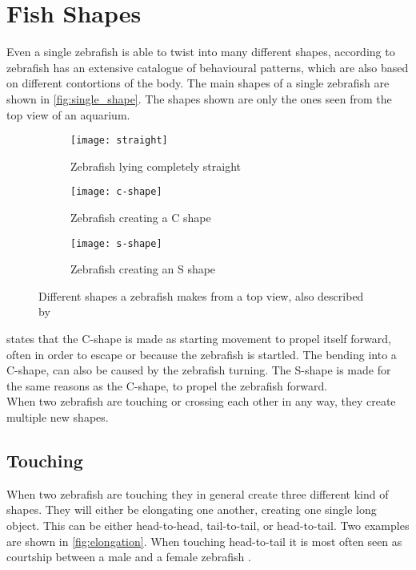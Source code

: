 \section{Fish Shapes}
Even a single zebrafish is able to twist into many different shapes, according to \cite{Kalueff2013} zebrafish has an extensive catalogue of behavioural patterns, which are also based on different contortions of the body. The main shapes of a single zebrafish are shown in \autoref{fig:single_shape}. The shapes shown are only the ones seen from the top view of an aquarium.

\begin{figure}[H]
	\centering
	\begin{subfigure}[b]{0.3\textwidth}
		\texttt{[image: straight]}
		\caption{Zebrafish lying completely straight}
		\label{fig:straight_fish}
	\end{subfigure}
	\begin{subfigure}[b]{0.3\textwidth}
		\texttt{[image: c-shape]}
		\caption{Zebrafish creating a C shape}
		\label{fig:c-shape_fish}
	\end{subfigure}
	\begin{subfigure}[b]{0.3\textwidth}
		\texttt{[image: s-shape]}
		\caption{Zebrafish creating an S shape}
		\label{fig:s-shape_fish}
	\end{subfigure}
\caption{Different shapes a zebrafish makes from a top view, also described by \cite{Kalueff2013}}
\label{fig:single_shape}
\end{figure}

\cite{Kalueff2013} states that the C-shape is made as starting movement to propel itself forward, often in order to escape or because the zebrafish is startled. The bending into a C-shape, can also be caused by the zebrafish turning. The S-shape is made for the same reasons as the C-shape, to propel the zebrafish forward.\\

When two zebrafish are touching or crossing each other in any way, they create multiple new shapes.

\subsection{Touching}
When two zebrafish are touching they in general create three different kind of shapes. They will either be elongating one another, creating one single long object. This can be either head-to-head, tail-to-tail, or head-to-tail. Two examples are shown in \autoref{fig:elongation}. When touching head-to-tail it is most often seen as courtship between a male and a female zebrafish \citep{Kalueff2013}.


